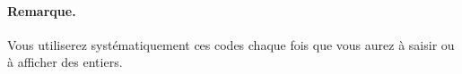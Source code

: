 \paragraph{Remarque.}
Vous utiliserez syst\'ematiquement ces codes chaque fois que vous
aurez \`a saisir ou \`a afficher des entiers.






